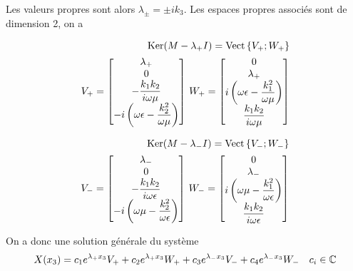 Les valeurs propres sont alors $\lambda_\pm = \pm i k_3$. Les espaces propres associés sont de dimension 2, on a 

\begin{align}
\operatorname{Ker}(M-\lambda_+I)=\operatorname{Vect}\left\lbrace V_+;W_+\right\rbrace \\
    V_+ = 
    \begin{bmatrix}
    \lambda_+ \\
        0 \\
        -\dfrac{k_1k_2}{i\omega\mu} \\
        -i\left(\omega\epsilon - \dfrac{k_2^2}{\omega\mu}\right) \\
    \end{bmatrix}
    \,
    W_+ = 
        \begin{bmatrix}
        0 \\
        \lambda_+ \\
        i\left(\omega\epsilon - \dfrac{k_1^2}{\omega\mu}\right) \\
        \dfrac{k_1k_2}{i\omega\mu} \\
    \end{bmatrix}
\end{align}

\begin{align}
\operatorname{Ker}(M-\lambda_-I)=\operatorname{Vect}\left\lbrace V_-;W_-\right\rbrace\\
    V_- = 
    \begin{bmatrix}
        \lambda_- \\
        0 \\
        -\dfrac{k_1k_2}{i\omega\epsilon} \\
        -i\left(\omega\mu - \dfrac{k_2^2}{\omega\epsilon}\right) \\
    \end{bmatrix}
    \,
    W_- = 
    \begin{bmatrix}
        0 \\
        \lambda_- \\
        i\left(\omega\mu - \dfrac{k_1^2}{\omega\epsilon}\right) \\
        \dfrac{k_1k_2}{i\omega\epsilon} \\
    \end{bmatrix}
\end{align}

On a donc une solution générale du système 
\begin{equation}
    X(x_3) = c_1e^{\lambda_+ x_3}V_+  + c_2e^{\lambda_+ x_3}W_+ + c_3e^{\lambda_- x_3}V_- +c_4e^{\lambda_- x_3}W_- \quad c_i \in \mathbb C
\end{equation}




